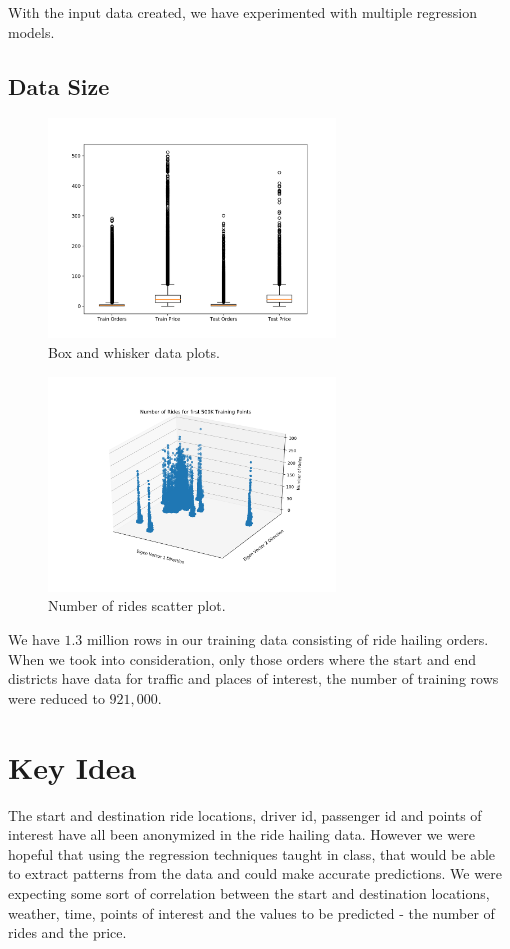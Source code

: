 \documentclass[paper=a4, fontsize=11pt]{scrartcl} %
\numberwithin{equation}{section} %
\numberwithin{table}{section} %
\begin{document}
With the input data created, we have experimented with multiple regression models.

\subsection{Data Size}

\begin{figure}[!htb]
\centering
\includegraphics[width=3in]{figures/boxplots.png}
\caption{Box and whisker data plots.}
\label{boxplots}
\end{figure}


\begin{figure}[!htb]
\centering
\includegraphics[width=3in]{figures/Rides3DScatter.png}
\caption{Number of rides scatter plot.}
\label{rides}
\end{figure}
We have $1.3$ million rows in our training data consisting of ride hailing orders. When we took into consideration, only those orders where the start and end districts have data for traffic and places of interest, the number of training rows were reduced to $921,000$.

\section{Key Idea}

The start and destination ride locations, driver id, passenger id and points of interest have all been anonymized in the ride hailing data. However we were hopeful that using the regression techniques taught in class, that would be able to extract patterns from the data and could make accurate predictions. We were expecting some sort of correlation between the start and destination locations, weather, time, points of interest and the values to be predicted - the number of rides and the price.\\
\end{document}
